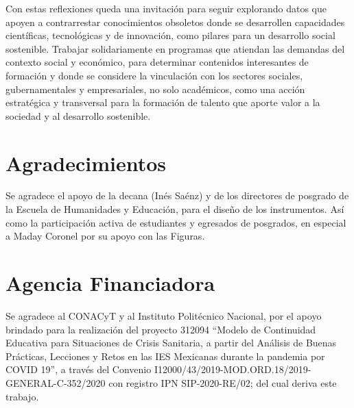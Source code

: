\documentclass{textolivre}
\begin{document}
Con estas reflexiones queda una invitación para seguir explorando datos que apoyen a contrarrestar conocimientos obsoletos donde se desarrollen capacidades científicas, tecnológicas y de innovación, como pilares para un desarrollo social sostenible. Trabajar solidariamente en programas que atiendan las demandas del contexto social y económico, para determinar contenidos interesantes de formación y donde se considere la vinculación con los sectores sociales, gubernamentales y empresariales, no solo académicos, como una acción estratégica y transversal para la formación de talento que aporte valor a la sociedad y al desarrollo sostenible.

\section{Agradecimientos}\label{sec-links}
Se agradece el apoyo de la decana (Inés Saénz) y de los directores de posgrado de la Escuela de Humanidades y Educación, para el diseño de los instrumentos. Así como la participación activa de estudiantes y egresados de posgrados, en especial a Maday Coronel por su apoyo con las Figuras.

\section{Agencia Financiadora}\label{sec-outras-estr}
Se agradece al CONACyT y al Instituto Politécnico Nacional, por el apoyo brindado para la realización del proyecto 312094 “Modelo de Continuidad Educativa para Situaciones de Crisis Sanitaria, a partir del Análisis de Buenas Prácticas, Lecciones y Retos en las IES Mexicanas durante la pandemia por COVID 19”,  a través del Convenio I12000/43/2019-MOD.ORD.18/2019-GENERAL-C-352/2020 con registro IPN SIP-2020-RE/02; del cual deriva este trabajo.

\printbibliography\label{sec-bib}
\end{document}
